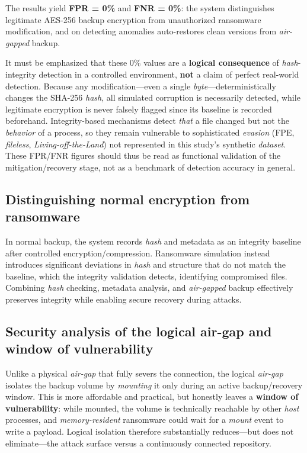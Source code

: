 \documentclass{iaesarticle}
\begin{document}
The results yield \textbf{FPR = 0\%} and \textbf{FNR = 0\%}: the system distinguishes legitimate AES-256 backup encryption from unauthorized ransomware modification, and on detecting anomalies auto-restores clean versions from \textit{air-gapped} backup.

It must be emphasized that these 0\% values are a \textbf{logical consequence} of \textit{hash}-integrity detection in a controlled environment, \textbf{not} a claim of perfect real-world detection. Because any modification---even a single \textit{byte}---deterministically changes the SHA-256 \textit{hash}, all simulated corruption is necessarily detected, while legitimate encryption is never falsely flagged since its baseline is recorded beforehand. Integrity-based mechanisms detect \textit{that} a file changed but not the \textit{behavior} of a process, so they remain vulnerable to sophisticated \textit{evasion} (FPE, \textit{fileless}, \textit{Living-off-the-Land}) not represented in this study's synthetic \textit{dataset}. These FPR/FNR figures should thus be read as functional validation of the mitigation/recovery stage, not as a benchmark of detection accuracy in general.

\subsection{Distinguishing normal encryption from ransomware}
In normal backup, the system records \textit{hash} and metadata as an integrity baseline after controlled encryption/compression. Ransomware simulation instead introduces significant deviations in \textit{hash} and structure that do not match the baseline, which the integrity validation detects, identifying compromised files. Combining \textit{hash} checking, metadata analysis, and \textit{air-gapped} backup effectively preserves integrity while enabling secure recovery during attacks.

\subsection{Security analysis of the logical air-gap and window of vulnerability}
Unlike a physical \textit{air-gap} that fully severs the connection, the logical \textit{air-gap} isolates the backup volume by \textit{mounting} it only during an active backup/recovery window. This is more affordable and practical, but honestly leaves a \textbf{window of vulnerability}: while mounted, the volume is technically reachable by other \textit{host} processes, and \textit{memory-resident} ransomware could wait for a \textit{mount} event to write a payload. Logical isolation therefore substantially reduces---but does not eliminate---the attack surface versus a continuously connected repository.
\end{document}

